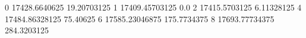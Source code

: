 0 17428.6640625 19.20703125
1 17409.45703125 0.0
2 17415.5703125 6.11328125
4 17484.86328125 75.40625
6 17585.23046875 175.7734375
8 17693.77734375 284.3203125
